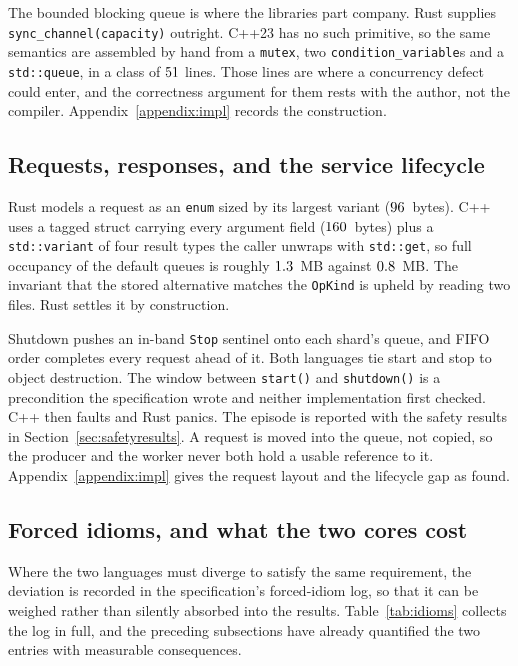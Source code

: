 \documentclass[english,oneside,a4paper,censored,csm,software-track-2020]{HYthesisML}
\begin{document}
\begin{appendices}
The bounded blocking queue is where the libraries part company. Rust supplies
\texttt{sync\_channel(capacity)} outright. C++23 has no such primitive, so the same semantics are
assembled by hand from a \texttt{mutex}, two \texttt{condition\_variable}s and a
\texttt{std::queue}, in a class of $51$ lines. Those lines are where a
concurrency defect could enter, and the correctness argument for them rests with the author, not
the compiler. Appendix~\ref{appendix:impl} records the construction.

\subsection{Requests, responses, and the service lifecycle}\label{sec:tagged}
\label{sec:request}
Rust models a request as an \texttt{enum} sized by its largest variant
($96$~bytes). C++ uses a tagged struct carrying every argument field
($160$~bytes) plus a \texttt{std::variant} of four result types the caller unwraps
with \texttt{std::get}, so full occupancy of the default queues is roughly
$1.3$~MB against $0.8$~MB. The invariant that the stored
alternative matches the \texttt{OpKind} is upheld by reading two files. Rust settles it by
construction.

Shutdown pushes an in-band \texttt{Stop} sentinel onto each shard's queue, and FIFO order
completes every request ahead of it. Both languages tie start and stop to object destruction.
The window between \texttt{start()} and \texttt{shutdown()} is a precondition the specification
wrote and neither implementation first checked. C++ then faults and Rust panics. The episode is
reported with the safety results in Section~\ref{sec:safetyresults}.
A request is moved into the queue, not copied, so the producer and the worker never both hold a
usable reference to it. Appendix~\ref{appendix:impl} gives the request layout and the lifecycle
gap as found.

\subsection{Forced idioms, and what the two cores cost}
\label{sec:idioms}
Where the two languages must diverge to satisfy the same requirement, the deviation is recorded
in the specification's forced-idiom log, so that it can be weighed rather than silently absorbed
into the results. Table~\ref{tab:idioms} collects the log in full, and the preceding subsections
have already quantified the two entries with measurable consequences.


\end{appendices}
\end{document}
